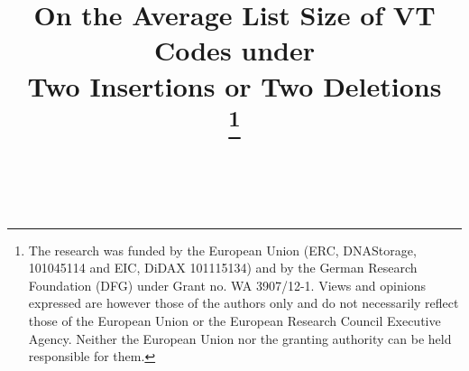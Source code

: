 \documentclass[conference, a4paper]{IEEEtran}
\begin{document}
\title{On the Average List Size of VT Codes under\\ Two Insertions or Two Deletions \\

\thanks{The research was funded by the European Union (ERC, DNAStorage, 101045114 and EIC, DiDAX 101115134) and by the German Research Foundation (DFG) under Grant no. WA 3907/12-1. Views and opinions expressed are however those of the authors only and do not necessarily reflect those of the European Union or the European Research Council Executive Agency. Neither the European Union nor the granting authority can be held responsible for them.}
}
\author{%
      \\[-5ex]

}
\maketitle
\end{document}
